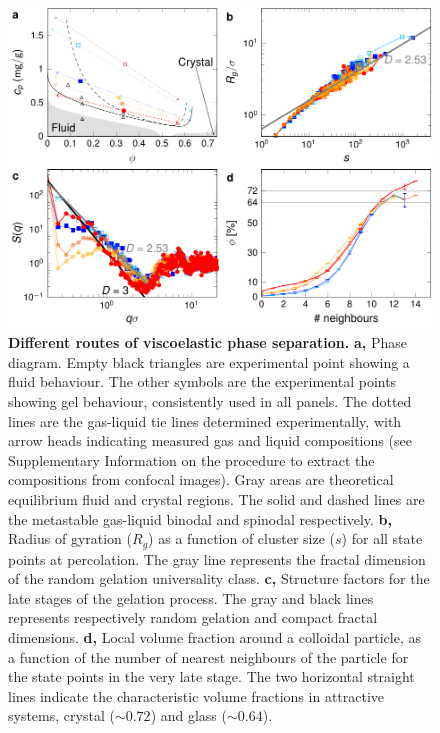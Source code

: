 \documentclass[preprint,amsmath,amssymb,superscriptaddress]{revtex4-1}
\begin{document}
\begin{figure}[!t]
 \centering
 \includegraphics{phase_separation.pdf}
 \caption{{\bf Different routes of viscoelastic phase separation.} 
{\bf a,} Phase diagram. Empty black triangles are experimental point showing a fluid behaviour. The other symbols are the experimental points showing gel behaviour, consistently used in all panels. The dotted lines are the gas-liquid tie lines determined experimentally, with arrow heads indicating measured gas and liquid compositions (see Supplementary Information on the procedure to extract the compositions from confocal images).  Gray areas are theoretical equilibrium fluid and crystal regions. The solid and dashed lines are the metastable gas-liquid binodal and spinodal respectively.
{\bf b,} Radius of gyration ($R_g$) as a function of cluster size ($s$) for all state points at percolation. The
 gray line represents the fractal dimension of the random gelation universality class.
{\bf c,} Structure factors for the late stages of the gelation process. The gray and black lines represents respectively random gelation and compact fractal dimensions.
{\bf d,} Local volume fraction around a colloidal particle, as a function of the number of nearest neighbours of the particle for the state points in the very late stage. 
The two horizontal straight lines indicate the characteristic volume fractions in attractive systems, crystal ($\sim 0.72$) and glass ($\sim 0.64$).
 }
 \label{fig:phase_separation}
\end{figure}



\clearpage
\end{document}
